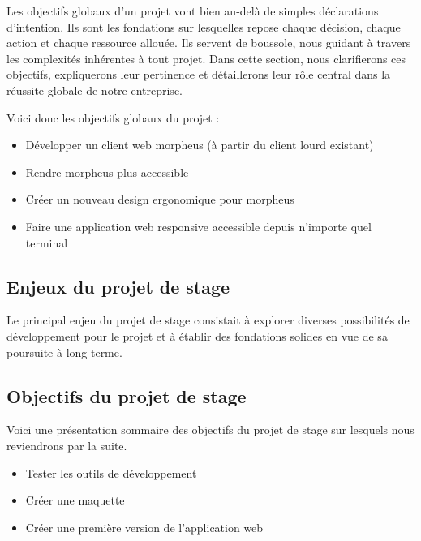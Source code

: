 \documentclass[a4paper, 12pt, french]{article}
\newcommand{\bdot}{\item[\color{ssiYellow}\ding{108}]}
\begin{document}
					Les objectifs globaux d'un projet vont bien au-delà de simples déclarations d'intention. Ils sont les fondations sur lesquelles repose chaque décision, chaque action et chaque ressource allouée. Ils servent de boussole, nous guidant à travers les complexités inhérentes à tout projet. Dans cette section, nous clarifierons ces objectifs, expliquerons leur pertinence et détaillerons leur rôle central dans la réussite globale de notre entreprise.
					
					Voici donc les objectifs globaux du projet :
					\begin{itemize}
						\bdot{Développer un client web morpheus (à partir du client lourd existant)}
						\bdot{Rendre morpheus plus accessible}
						\bdot{Créer un nouveau design ergonomique pour morpheus}
						\bdot{Faire une application web responsive accessible depuis n'importe quel terminal}%
					\end{itemize}

				
				\subsection{Enjeux du projet de stage}

					Le principal enjeu du projet de stage consistait à explorer diverses possibilités de développement pour le projet et à établir des fondations solides en vue de sa poursuite à long terme.


				\subsection{Objectifs du projet de stage}
					Voici une présentation sommaire des objectifs du projet de stage sur lesquels nous reviendrons par la suite.
					\begin{itemize}
						\bdot{Tester les outils de développement}
						\bdot{Créer une maquette}
						\bdot{Créer une première version de l'application web}
					\end{itemize}
\end{document}
